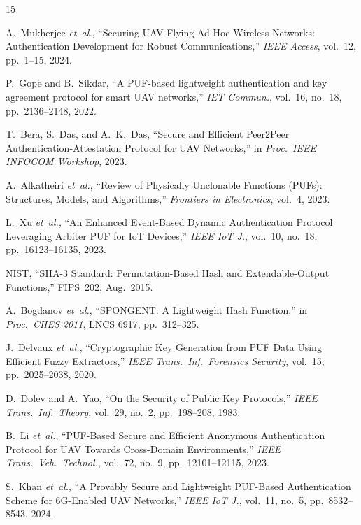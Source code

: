 \documentclass[conference]{IEEEtran}
\begin{document}
\balance

\begin{thebibliography}{15}

A.~Mukherjee \emph{et~al.}, ``Securing UAV Flying Ad Hoc Wireless Networks: Authentication Development for Robust Communications,'' \emph{IEEE Access}, vol.~12, pp.~1--15, 2024.

P.~Gope and B.~Sikdar, ``A PUF-based lightweight authentication and key agreement protocol for smart UAV networks,'' \emph{IET Commun.}, vol.~16, no.~18, pp.~2136--2148, 2022.

T.~Bera, S.~Das, and A.~K.~Das, ``Secure and Efficient Peer2Peer Authentication-Attestation Protocol for UAV Networks,'' in \emph{Proc.\ IEEE INFOCOM Workshop}, 2023.

A.~Alkatheiri \emph{et~al.}, ``Review of Physically Unclonable Functions (PUFs): Structures, Models, and Algorithms,'' \emph{Frontiers in Electronics}, vol.~4, 2023.

L.~Xu \emph{et~al.}, ``An Enhanced Event-Based Dynamic Authentication Protocol Leveraging Arbiter PUF for IoT Devices,'' \emph{IEEE IoT J.}, vol.~10, no.~18, pp.~16123--16135, 2023.

NIST, ``SHA-3 Standard: Permutation-Based Hash and Extendable-Output Functions,'' FIPS~202, Aug.~2015.

A.~Bogdanov \emph{et~al.}, ``SPONGENT: A Lightweight Hash Function,'' in \emph{Proc.\ CHES 2011}, LNCS 6917, pp.~312--325.

J.~Delvaux \emph{et~al.}, ``Cryptographic Key Generation from PUF Data Using Efficient Fuzzy Extractors,'' \emph{IEEE Trans.\ Inf.\ Forensics Security}, vol.~15, pp.~2025--2038, 2020.

D.~Dolev and A.~Yao, ``On the Security of Public Key Protocols,'' \emph{IEEE Trans.\ Inf.\ Theory}, vol.~29, no.~2, pp.~198--208, 1983.

B.~Li \emph{et~al.}, ``PUF-Based Secure and Efficient Anonymous Authentication Protocol for UAV Towards Cross-Domain Environments,'' \emph{IEEE Trans.\ Veh.\ Technol.}, vol.~72, no.~9, pp.~12101--12115, 2023.

S.~Khan \emph{et~al.}, ``A Provably Secure and Lightweight PUF-Based Authentication Scheme for 6G-Enabled UAV Networks,'' \emph{IEEE IoT J.}, vol.~11, no.~5, pp.~8532--8543, 2024.


\end{thebibliography}
\end{document}
